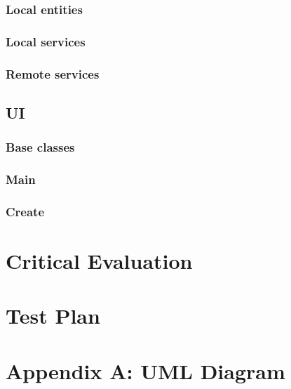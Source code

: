 \documentclass[english,a4paper,]{report}
\begin{document}
\hypertarget{local-entities}{%
\subsection{Local entities}\label{local-entities}}

\hypertarget{local-services}{%
\subsection{Local services}\label{local-services}}

\hypertarget{remote-services}{%
\subsection{Remote services}\label{remote-services}}

\hypertarget{ui}{%
\section{UI}\label{ui}}

\hypertarget{base-classes}{%
\subsection{Base classes}\label{base-classes}}

\hypertarget{main}{%
\subsection{Main}\label{main}}

\hypertarget{create}{%
\subsection{Create}\label{create}}

\hypertarget{critical-evaluation}{%
\chapter{Critical Evaluation}\label{critical-evaluation}}

\hypertarget{test-plan}{%
\chapter{Test Plan}\label{test-plan}}

\hypertarget{appendix-a-uml-diagram}{%
\chapter{Appendix A: UML Diagram}\label{appendix-a-uml-diagram}}
\end{document}
